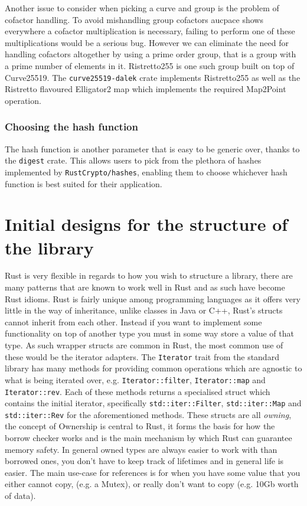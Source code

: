 Another issue to consider when picking a curve and group is the problem of cofactor handling.
To avoid mishandling group cofactors \gls{aucpace} shows everywhere a cofactor multiplication is necessary, failing to perform one of these multiplications would be a serious bug.
However we can eliminate the need for handling cofactors altogether by using a prime order group, that is a group with a prime number of elements in it.
Ristretto255 \cite{ristretto255} is one such group built on top of Curve25519.
The \texttt{curve25519-dalek} crate implements Ristretto255 as well as the Ristretto flavoured Elligator2 map \cite{elligator2} which implements the required \textsf{Map2Point} operation.

\subsubsection{Choosing the hash function}
The hash function is another parameter that is easy to be generic over, thanks to the \texttt{digest} crate.
This allows users to pick from the plethora of hashes implemented by \texttt{RustCrypto/hashes}, enabling them to choose whichever hash function is best suited for their application.

\section{Initial designs for the structure of the library}
Rust is very flexible in regards to how you wish to structure a library, there are many patterns that are known to work well in Rust and as such have become Rust idioms.
Rust is fairly unique among programming languages as it offers very little in the way of inheritance, unlike classes in Java or C++, Rust's structs cannot inherit from each other.
Instead if you want to implement some functionality on top of another type you must in some way store a value of that type.
As such wrapper structs are common in Rust, the most common use of these would be the iterator adapters.
The \texttt{Iterator} trait from the standard library has many methods for providing common operations which are agnostic to what is being iterated over, e.g. \texttt{Iterator::filter}, \texttt{Iterator::map} and \texttt{Iterator::rev}.
Each of these methods returns a specialised struct which contains the initial iterator, specifically \texttt{std::iter::Filter}, \texttt{std::iter::Map} and \texttt{std::iter::Rev} for the aforementioned methods.
These structs are all \textit{owning}, the concept of Ownership is central to Rust, it forms the basis for how the borrow checker works and is the main mechanism by which Rust can guarantee memory safety.
In general owned types are always easier to work with than borrowed ones, you don't have to keep track of lifetimes and in general life is easier.
The main use-case for references is for when you have some value that you either cannot copy, (e.g. a Mutex), or really don't want to copy (e.g. 10Gb worth of data).

